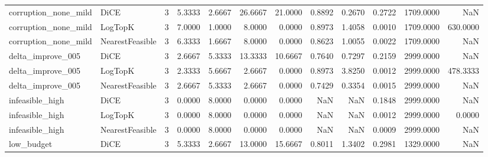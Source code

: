 \begin{tabular}{llrrrrrrrrrr}
corruption\_none\_mild &            DiCE &      3 &            5.3333 &          2.6667 &         26.6667 &       21.0000 &             0.8892 &         0.2670 &       0.2722 &          1709.0000 &                   NaN \\
corruption\_none\_mild &         LogTopK &      3 &            7.0000 &          1.0000 &          8.0000 &        0.0000 &             0.8973 &         1.4058 &       0.0010 &          1709.0000 &              630.0000 \\
corruption\_none\_mild & NearestFeasible &      3 &            6.3333 &          1.6667 &          8.0000 &        0.0000 &             0.8623 &         1.0055 &       0.0022 &          1709.0000 &                   NaN \\
   delta\_improve\_005 &            DiCE &      3 &            2.6667 &          5.3333 &         13.3333 &       10.6667 &             0.7640 &         0.7297 &       0.2159 &          2999.0000 &                   NaN \\
   delta\_improve\_005 &         LogTopK &      3 &            2.3333 &          5.6667 &          2.6667 &        0.0000 &             0.8973 &         3.8250 &       0.0012 &          2999.0000 &              478.3333 \\
   delta\_improve\_005 & NearestFeasible &      3 &            2.6667 &          5.3333 &          2.6667 &        0.0000 &             0.7429 &         0.3354 &       0.0015 &          2999.0000 &                   NaN \\
     infeasible\_high &            DiCE &      3 &            0.0000 &          8.0000 &          0.0000 &        0.0000 &                NaN &            NaN &       0.1848 &          2999.0000 &                   NaN \\
     infeasible\_high &         LogTopK &      3 &            0.0000 &          8.0000 &          0.0000 &        0.0000 &                NaN &            NaN &       0.0012 &          2999.0000 &                0.0000 \\
     infeasible\_high & NearestFeasible &      3 &            0.0000 &          8.0000 &          0.0000 &        0.0000 &                NaN &            NaN &       0.0009 &          2999.0000 &                   NaN \\
          low\_budget &            DiCE &      3 &            5.3333 &          2.6667 &         13.0000 &       15.6667 &             0.8011 &         1.3402 &       0.2981 &          1329.0000 &                   NaN \\

\end{tabular}
